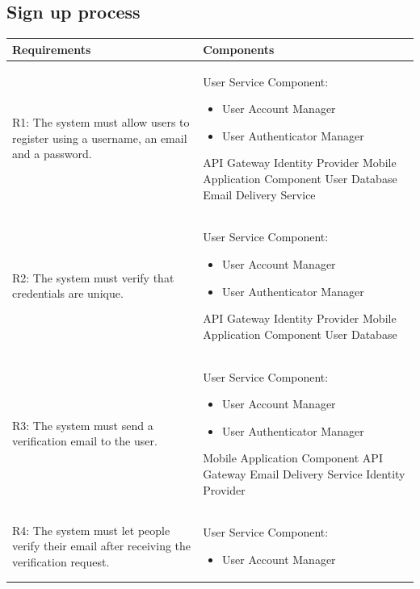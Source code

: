 \subsection{Sign up process}
\begin{table}[ht]
\begin{tabular}{|p{9cm}|p{6cm}|}
\hline
\textbf{Requirements}      & \multicolumn{1}{l|}{\textbf{Components}}\\ \hline
R1: The system must allow users to register using a username, an email and a password. 
&
User Service Component: 
\begin{itemize}
  \item User Account Manager
  \item User Authenticator Manager
\end{itemize}
API Gateway
\newline
Identity Provider
\newline
Mobile Application Component
\newline
User Database
\newline
Email Delivery Service
\\ \hline
R2: The system must verify that credentials are unique.   
&
User Service Component: 
\begin{itemize}
  \item User Account Manager
  \item User Authenticator Manager
\end{itemize}
API Gateway
\newline
Identity Provider
\newline
Mobile Application Component
\newline
User Database
\\ \hline
R3: The system must send a verification email to the user. 
&
User Service Component: 
\begin{itemize}
  \item User Account Manager
  \item User Authenticator Manager
\end{itemize}
Mobile Application Component
\newline
API Gateway
\newline
Email Delivery Service
\newline
Identity Provider
\\ \hline
R4: The system must let people verify their email after receiving the verification request. 
&
User Service Component:  
\begin{itemize}
  \item User Account Manager

\end{itemize}
\end{tabular}
\end{table}
